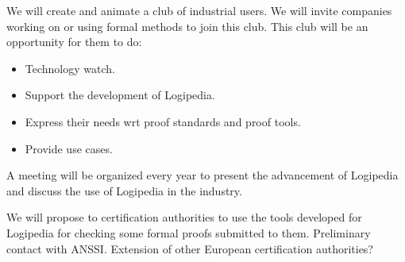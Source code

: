 \begin{workpackage}[id=dissemination,wphases=0-48,type=MGT,
  short=Dissemination,%
  title={Dissemination, communication and exploitation},
  lead=Inr]
\begin{tasklist}
\begin{task}[id=researchers-club,
      title=Expanding the use of Logipedia in research,
      lead=Bir,BirRM=2]
  \end{task}

  \begin{task}[id=industrial-club,
      title=Expanding the use of Logipedia in the industry,
      lead=Irt,IrtRM=2]
    We will create and animate a club of industrial users. We will
    invite companies working on or using formal methods to join this
    club. This club will be an opportunity for them to do:
    \begin{itemize}
    \item Technology watch.
    \item Support the development of Logipedia.
    \item Express their needs wrt proof standards and proof tools.
    \item Provide use cases.
    \end{itemize}
    A meeting will be organized every year to present the advancement
    of Logipedia and discuss the use of Logipedia in the industry.
  \end{task}

  \begin{task}[id=certif-club,
      title=Expanding the use of Logipedia within certification authorities,
      lead=Irt,IrtRM=2]
    We will propose to certification authorities to use the tools
    developed for Logipedia for checking some formal proofs submitted
    to them. Preliminary contact with ANSSI. Extension of other
    European certification authorities?
  \end{task}


\end{tasklist}
\end{workpackage}
